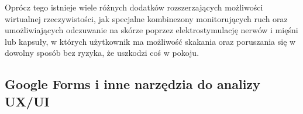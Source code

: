Oprócz tego istnieje wiele różnych dodatków rozszerzających możliwości wirtualnej rzeczywistości, jak specjalne kombinezony monitorujących ruch oraz umożliwiających odczuwanie na skórze poprzez elektrostymulację nerwów i mięśni lub kapsuły, w których użytkownik ma możliwość skakania oraz poruszania się w dowolny sposób bez ryzyka, że uszkodzi coś w pokoju.

\subsection{Google Forms i inne narzędzia do analizy UX/UI}










